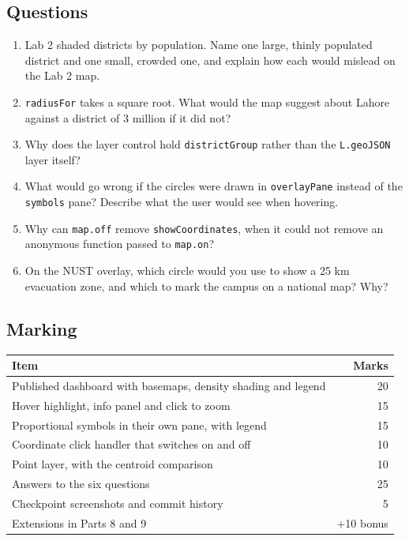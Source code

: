 \documentclass{article}
\newcommand{\cd}[1]{\texttt{#1}}
\begin{document}
\subsection{Questions}

\begin{enumerate}
  \item Lab 2 shaded districts by population. Name one large, thinly
        populated district and one small, crowded one, and explain how
        each would mislead on the Lab 2 map.
  \item \cd{radiusFor} takes a square root. What would the map
        suggest about Lahore against a district of 3 million if it did
        not?
  \item Why does the layer control hold \cd{districtGroup} rather than
        the \cd{L.geoJSON} layer itself?
  \item What would go wrong if the circles were drawn in
        \cd{overlayPane} instead of the \cd{symbols} pane? Describe what
        the user would see when hovering.
  \item Why can \cd{map.off} remove \cd{showCoordinates}, when it could
        not remove an anonymous function passed to \cd{map.on}?
  \item On the NUST overlay, which circle would you use to show a 25 km
        evacuation zone, and which to mark the campus on a national map?
        Why?
\end{enumerate}

\subsection{Marking}

\begin{tabularx}{\textwidth}{@{}X r@{}}
\toprule
\textbf{Item} & \textbf{Marks} \\
\midrule
Published dashboard with basemaps, density shading and legend & 20 \\
Hover highlight, info panel and click to zoom                  & 15 \\
Proportional symbols in their own pane, with legend           & 15 \\
Coordinate click handler that switches on and off             & 10 \\
Point layer, with the centroid comparison                     & 10 \\
Answers to the six questions                                  & 25 \\
Checkpoint screenshots and commit history                     & 5 \\
\midrule
Extensions in Parts 8 and 9                                   & +10 bonus \\
\bottomrule
\end{tabularx}
\end{document}
